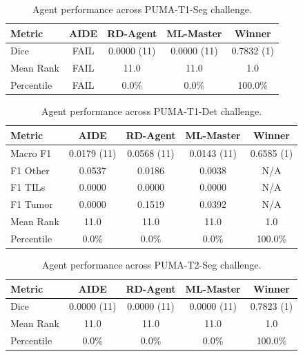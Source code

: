 \begin{table}[htbp]
\centering
\small
\caption{Agent performance across PUMA-T1-Seg challenge.}
\vspace{3pt} \label{tab:puma-track1-task1}
\begin{tabular}{lcccc}
\toprule
\textbf{Metric} & \textbf{AIDE} & \textbf{RD-Agent} & \textbf{ML-Master} & \textbf{Winner} \\
\midrule
Dice & FAIL & 0.0000 (11) & 0.0000 (11) & 0.7832 (1) \\
\midrule
Mean Rank & FAIL & 11.0 & 11.0 & 1.0 \\
Percentile & FAIL & 0.0\% & 0.0\% & 100.0\% \\
\bottomrule
\end{tabular}
\end{table}

\begin{table}[htbp]
\centering
\small
\caption{Agent performance across PUMA-T1-Det challenge.}
\vspace{3pt} \label{tab:puma-track1-task2}
\begin{tabular}{lcccc}
\toprule
\textbf{Metric} & \textbf{AIDE} & \textbf{RD-Agent} & \textbf{ML-Master} & \textbf{Winner} \\
\midrule
Macro F1 & 0.0179 (11) & 0.0568 (11) & 0.0143 (11) & 0.6585 (1) \\
F1 Other & 0.0537 & 0.0186 & 0.0038 & N/A \\
F1 TILs & 0.0000 & 0.0000 & 0.0000 & N/A \\
F1 Tumor & 0.0000 & 0.1519 & 0.0392 & N/A \\
\midrule
Mean Rank & 11.0 & 11.0 & 11.0 & 1.0 \\
Percentile & 0.0\% & 0.0\% & 0.0\% & 100.0\% \\
\bottomrule
\end{tabular}
\end{table}

\begin{table}[htbp]
\centering
\small
\caption{Agent performance across PUMA-T2-Seg challenge.}
\vspace{3pt} \label{tab:puma-track2-task1}
\begin{tabular}{lcccc}
\toprule
\textbf{Metric} & \textbf{AIDE} & \textbf{RD-Agent} & \textbf{ML-Master} & \textbf{Winner} \\
\midrule
Dice & 0.0000 (11) & 0.0000 (11) & 0.0000 (11) & 0.7823 (1) \\
\midrule
Mean Rank & 11.0 & 11.0 & 11.0 & 1.0 \\
Percentile & 0.0\% & 0.0\% & 0.0\% & 100.0\% \\
\bottomrule
\end{tabular}
\end{table}

